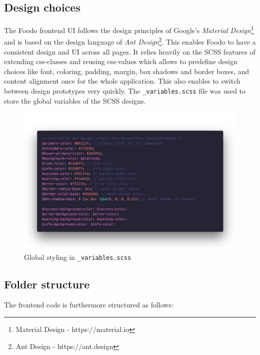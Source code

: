 \subsection*{Design choices}
The Foodo frontend UI follows the design principles of Google’s \textit{Material Design}\footnote{Material Design - https://material.io} and is based on the design language of \textit{Ant Design}\footnote{Ant Design - https://ant.design}. This enables Foodo to have a consistent design and UI across all pages. It relies heavily on the SCSS features of extending css-classes and reusing css-values which allows to predefine design choices like font, coloring, padding, margin, box shadows and border boxes, and content alignment once for the whole application. This also enables to switch between design prototypes very quickly. The \texttt{\_variables.scss} file was used to store the global variables of the SCSS designs. 
\vspace{-2em}
\begin{figure}[ht]
	\captionsetup{justification=centering}
	\begin{center}
		\includegraphics[scale=0.25]{Ressourcen/img/code/scss.png}
		\vspace{-3em}
		\caption{Global styling in \texttt{\_variables.scss}}
	\end{center}
\end{figure}

\subsection*{Folder structure}
The frontend code is furthermore structured as follows:


